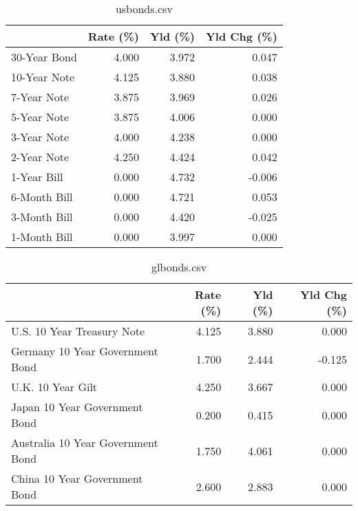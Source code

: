 \documentclass{article}%
\begin{document}
%


\begin{table}[htbp]%
\caption{usbonds.csv}%
\centering%
\begin{adjustbox}{width=1\textwidth}%
\begin{tabular}{lrrr}
\toprule
             &  Rate (\%) &  Yld (\%) &  Yld Chg (\%) \\
\midrule
30-Year Bond &     4.000 &    3.972 &        0.047 \\
10-Year Note &     4.125 &    3.880 &        0.038 \\
 7-Year Note &     3.875 &    3.969 &        0.026 \\
 5-Year Note &     3.875 &    4.006 &        0.000 \\
 3-Year Note &     4.000 &    4.238 &        0.000 \\
 2-Year Note &     4.250 &    4.424 &        0.042 \\
 1-Year Bill &     0.000 &    4.732 &       -0.006 \\
6-Month Bill &     0.000 &    4.721 &        0.053 \\
3-Month Bill &     0.000 &    4.420 &       -0.025 \\
1-Month Bill &     0.000 &    3.997 &        0.000 \\
\bottomrule
\end{tabular}
%
\end{adjustbox}%
\end{table}

%


\begin{table}[htbp]%
\caption{glbonds.csv}%
\centering%
\begin{adjustbox}{width=1\textwidth}%
\begin{tabular}{lrrr}
\toprule
                                  &  Rate (\%) &  Yld (\%) &  Yld Chg (\%) \\
\midrule
       U.S. 10 Year Treasury Note &     4.125 &    3.880 &        0.000 \\
  Germany 10 Year Government Bond &     1.700 &    2.444 &       -0.125 \\
                U.K. 10 Year Gilt &     4.250 &    3.667 &        0.000 \\
    Japan 10 Year Government Bond &     0.200 &    0.415 &        0.000 \\
Australia 10 Year Government Bond &     1.750 &    4.061 &        0.000 \\
    China 10 Year Government Bond &     2.600 &    2.883 &        0.000 \\
\bottomrule
\end{tabular}
%
\end{adjustbox}%
\end{table}
\end{document}
